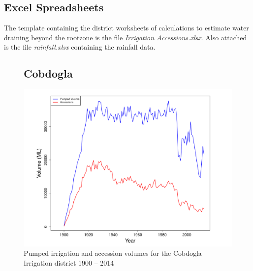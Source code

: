 \documentclass[a4paper, titlepage, 12pt]{article}\usepackage[]{graphicx}\usepackage[]{color}
\makeatletter
\def\maxwidth{ %
  \ifdim\Gin@nat@width>\linewidth
    \linewidth
  \else
    \Gin@nat@width
  \fi
}
\newenvironment{knitrout}{}{} %
\makeatother
\begin{document}
\begin{sffamily}
\begin{appendices}
\section{Excel\textsuperscript{\textregistered} Spreadsheets} \label{excel} The template containing the district worksheets of calculations to estimate water draining beyond the rootzone is the file \textit{Irrigation Accessions.xlsx}. Also attached is the file \textit{rainfall.xlsx} containing the rainfall data.



\begin{figure}
\section{Cobdogla}
\begin{knitrout}
\color{fgcolor}
\includegraphics[width=\maxwidth]{../figures/Cobdogla-1} 

\end{knitrout}
\caption{Pumped irrigation and accession volumes for the Cobdogla Irrigation district 1900 -- 2014}
\label{fig04}
\end{figure}

\begin{figure}

\end{figure}
\end{appendices}
\end{sffamily}
\end{document}

